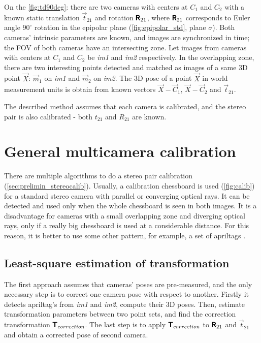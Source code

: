 On the \autoref{fig:td90deg}: there are two cameras with centers at $C_1$ and $C_2$ with a known static translation $\vec{t}_{21}$ and rotation $\pmb{\mathsf{R}}_{21}$, where $\pmb{\mathsf{R}}_{21}$ corresponds to Euler angle $90^\circ$ rotation in the epipolar plane (\autoref{fig:epipolar_std}, plane $\sigma$).
Both cameras' intrinsic parameters are known, and images are synchronized in time; the FOV of both cameras have an intersecting zone.
Let images from cameras with centers at $C_1$ and $C_2$ be \textit{im1} and \textit{im2} respectively.
In the overlapping zone, there are two interesting points detected and matched as images of a same 3D point $\vec{X}$: $\vec{m}_1$ on \textit{im1} and $\vec{m}_2$ on \textit{im2}.
The 3D pose of a point $\vec{X}$ in world measurement units is obtain from known vectors $\vec{X} - \vec{C}_1$, $\vec{X} - \vec{C}_2$ and $\vec{t}_{21}$. 

The described method assumes that each camera is calibrated, and the stereo pair is also calibrated - both $t_{21}$ and $R_{21}$ are known.

\section{General multicamera calibration}
There are multiple algorithms to do a stereo pair calibration (\autoref{sec:prelimin_stereocalib}). 
Usually, a calibration chessboard is used (\autoref{fig:calib}) for a standard stereo camera with parallel or converging optical rays.
It can be detected and used only when the whole chessboard is seen in both images.
It is a disadvantage for cameras with a small overlapping zone and diverging optical rays, only if a really big chessboard is used at a considerable distance.
For this reason, it is better to use some other pattern, for example, a set of apriltags \cite{Malyuta2019}. 

\subsection{Least-square estimation of transformation}
\label{sec:lsq_umeyama}
The first approach assumes that cameras' poses are pre-measured, and the only necessary step is to correct one camera pose with respect to another.
Firstly it detects apriltag's from \textit{im1} and \textit{im2}, compute their 3D poses.
Then, estimate transformation parameters between two point sets, and find the correction transformation $\pmb{\mathsf{T}}_{correction}$.
The last step is to apply $\pmb{\mathsf{T}}_{correction}$ to $\pmb{\mathsf{R}}_{21}$ and $\vec{t}_{21}$ and obtain a corrected pose of second camera.

